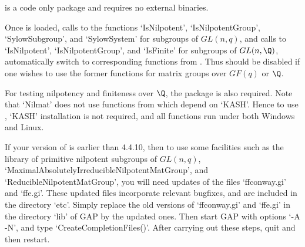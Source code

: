 
 is a {\GAP} code only package and requires no
external binaries.

Once  is loaded, calls to the {\GAP} functions
`IsNilpotent', `IsNilpotentGroup', `SylowSubgroup', and
`SylowSystem' for subgroups of $GL(n,q)$, and calls to
`IsNilpotent', `IsNilpotentGroup', and `IsFinite' for subgroups of
$GL(n,\Q)$, automatically switch to corresponding functions
from . Thus  should be disabled if
one wishes to use the former {\GAP} functions for matrix groups
over $GF(q)$ or $\Q$.

For testing nilpotency and finiteness over $\Q$, the {\GAP}
package  is also required. Note that `Nilmat'
does not use functions from  which depend on
`KASH'. Hence to use , `KASH' installation is not
required, and all  functions run under both
Windows and Linux.

If your version of {\GAP} is earlier than {\GAP} 4.4.10, then to
use some  facilities such as the library of
primitive nilpotent subgroups of $GL(n,q)$,
`MaximalAbsolutelyIrreducibleNilpotentMatGroup', and
`ReducibleNilpotentMatGroup', you will need updates of the files
`ffconway.gi' and `ffe.gi'. These updated files incorporate
relevant bugfixes, and  are included in the 
directory `etc'. Simply replace the old versions of `ffconway.gi'
and `ffe.gi' in the directory `lib' of {\sf GAP} by the updated
ones. Then start {\sf GAP} with options `-A -N', and type
`CreateCompletionFiles()'. After carrying out these steps, quit
{\GAP} and then restart.
